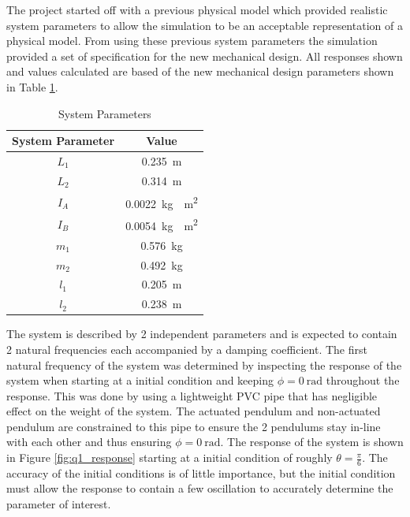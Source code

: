 The project started off with a previous physical model which provided realistic system parameters to allow the simulation to be an acceptable representation of a physical model. From using these previous system parameters the simulation provided a set of specification for the new mechanical design. All responses shown and values calculated are based of the new mechanical design parameters shown in Table \ref{table:system_param}.\\


		\begin{table}[]
	\centering
	\begin{tabular}{|c|c|}
		\hline
		System Parameter & Value \\
		\hline
		\hline
		$L_{1}$ & \SI{0.235}{m} \\
		\hline
		$L_{2}$ & \SI{0.314}{m} \\ 
		\hline
		$I_{A}$ & \SI{ 0.0022}{kg\cdot m^2}\\
		\hline
		$I_{B}$ & \SI{0.0054}{kg\cdot m^2}\\
		\hline
		$m_{1}$ & \SI{0.576}{kg}\\
		\hline
		$m_{2}$ & \SI{0.492}{kg} \\
		\hline
		$l_{1}$ & \SI{0.205}{m}\\
		\hline
		$l_{2}$ & \SI{0.238}{m}\\
		\hline
	\end{tabular}
	\caption{System Parameters}
	\label{table:system_param}
\end{table}


The system is described by 2 independent parameters and is expected to contain 2 natural frequencies each accompanied by a damping coefficient. The first natural frequency of the system was determined by inspecting the response of the system when starting at a initial condition and keeping $\phi = \SI{0}{\radian}$ throughout the response. This was done by using a lightweight PVC pipe that has negligible effect on the weight of the system. The actuated pendulum and non-actuated pendulum are constrained to this pipe to ensure the 2 pendulums stay in-line with each other and thus ensuring $\phi = \SI{0}{\radian}$. The response of the system is shown in Figure \ref{fig:q1_response} starting at a initial condition of roughly $\theta = \frac{\pi}{6}$. The accuracy of the initial conditions is of little importance, but the initial condition must allow the response to contain a few oscillation to accurately determine the parameter of interest.\\

